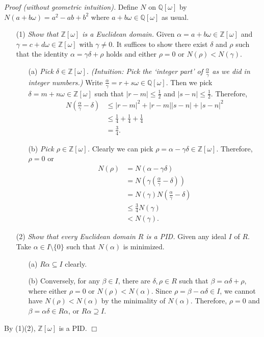 \documentclass{article}
\begin{document}
\emph{Proof (without geometric intuition).}
Define $N$ on $\mathbb{Q}[\omega]$ by $N(a+b\omega) = a^2-ab+b^2$ where
$a+b\omega \in \mathbb{Q}[\omega]$ as usual.
\begin{enumerate}
\item[(1)]
\emph{Show that $\mathbb{Z}[\omega]$ is a Euclidean domain.}
Given $\alpha = a+b\omega \in \mathbb{Z}[\omega]$ and
$\gamma = c+d\omega \in \mathbb{Z}[\omega]$ with $\gamma \neq 0$.
It suffices to show there exist $\delta$ and $\rho$ such that the identity
$\alpha = \gamma\delta + \rho$ holds and
either $\rho = 0$ or $N(\rho) < N(\gamma)$.
\begin{enumerate}
\item[(a)]
\emph{Pick $\delta \in \mathbb{Z}[\omega].$
(Intuition: Pick the `integer part' of $\frac{\alpha}{\gamma}$
as we did in integer numbers.)}
Write $\frac{\alpha}{\gamma} = r+s\omega \in \mathbb{Q}[\omega]$.
Then we pick $\delta = m+n\omega \in \mathbb{Z}[\omega]$ such that
$|r-m| \leq \frac{1}{2}$ and $|s-n| \leq \frac{1}{2}$.
Therefore,
\begin{align*}
N\left( \frac{\alpha}{\gamma} - \delta \right)
&\leq |r-m|^2 + |r-m||s-n| + |s-n|^2 \\
&\leq \frac{1}{4} + \frac{1}{4} + \frac{1}{4} \\
&= \frac{3}{4}.
\end{align*}
\item[(b)]
\emph{Pick $\rho \in \mathbb{Z}[\omega]$.}
Clearly we can pick $\rho = \alpha - \gamma\delta \in \mathbb{Z}[\omega]$.
Therefore, $\rho = 0$ or
\begin{align*}
N(\rho)
&= N(\alpha - \gamma\delta) \\
&= N\left( \gamma\left( \frac{\alpha}{\gamma} - \delta \right) \right) \\
&= N(\gamma) N\left( \frac{\alpha}{\gamma} - \delta \right) \\
&\leq \frac{3}{4} N(\gamma) \\
&< N(\gamma).
\end{align*}
\end{enumerate}
\item[(2)]
\emph{Show that every Euclidean domain $R$ is a PID.}
Given any ideal $I$ of $R$.
Take $\alpha \in I \setminus \{0\}$ such that $N(\alpha)$ is minimized.
\begin{enumerate}
  \item[(a)]
  $R\alpha \subseteq I$ clearly.
  \item[(b)]
  Conversely, for any $\beta \in I$, there are $\delta, \rho \in R$
  such that $\beta = \alpha \delta + \rho$, where either $\rho = 0$
  or $N(\rho) < N(\alpha)$.
  Since $\rho = \beta - \alpha \delta \in I$,
  we cannot have $N(\rho) < N(\alpha)$ by the minimality of $N(\alpha)$.
  Therefore, $\rho = 0$ and $\beta = \alpha \delta \in R\alpha$,
  or $R\alpha \supseteq I$.
\end{enumerate}
\end{enumerate}
By (1)(2),
$\mathbb{Z}[\omega]$ is a PID.
$\Box$ \\\\
\end{document}
